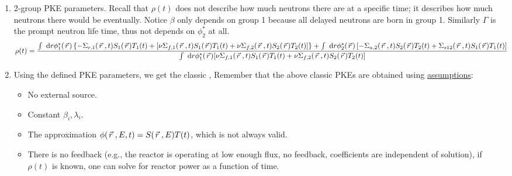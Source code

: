 \documentclass{school-22.211-notes}
\begin{document}
\begin{enumerate}
\item 2-group PKE parameters.  Recall that $\rho(t)$ does not describe how much neutrons there are at a specific time; it describes how much neutrons there would be eventually.  Notice $\beta$ only depends on group 1 because all delayed neutrons are born in group 1. Similarly $\Gamma$ is the prompt neutron life time, thus not depends on $\phi_2^*$ at all. 
\scriptsize
\begin{align}
\rho(t) &= \frac{  \int \mbox{ }\mathrm{d} r  \phi_1^* (\left.\vec{r}\right.)  \left\{  - \Sigma_{r,1} (\left.\vec{r}\right.,t) S_1(\left.\vec{r}\right.) T_1(t)  + [\nu \Sigma_{f,1} (\left.\vec{r}\right., t) S_{1} (\left.\vec{r}\right.) T_{1}(t) + \nu \Sigma_{f,2} (\left.\vec{r}\right., t) S_2 (\left.\vec{r}\right.) T_2 (t)] \right\}
+  \int \mbox{ }\mathrm{d} r  \phi_2^* (\left.\vec{r}\right.)  \left[ - \Sigma_{a,2} (\left.\vec{r}\right.,t) S_2(\left.\vec{r}\right.) T_2(t) + \Sigma_{s12} (\left.\vec{r}\right., t) S_1 (\left.\vec{r}\right.) T_1 (t)  \right]  }
{\int \mbox{ }\mathrm{d} r \phi_1^* (\left.\vec{r}\right.)  [\nu \Sigma_{f,1} (\left.\vec{r}\right., t) S_{1} (\left.\vec{r}\right.) T_{1}(t) + \nu \Sigma_{f,2} (\left.\vec{r}\right., t) S_2 (\left.\vec{r}\right.) T_2 (t)] } 
\end{align}
\normalsize
{}

\item Using the defined PKE parameters, we get the classic ,
Remember that the above classic PKEs are obtained using \uline{assumptions}: 
\begin{itemize}
\item No external source.
\item Constant $\beta_i, \lambda_i$. 
\item The approximation $\phi(\left.\vec{r}\right., E, t) = S(\left.\vec{r}\right., E) T(t)$, which is not always valid. 
\item There is no feedback (e.g., the reactor is operating at low enough flux, no feedback, coefficients are independent of solution), if $\rho(t)$ is known, one can solve for reactor power as a function of time.
\end{itemize}


\end{enumerate}
\end{document}
